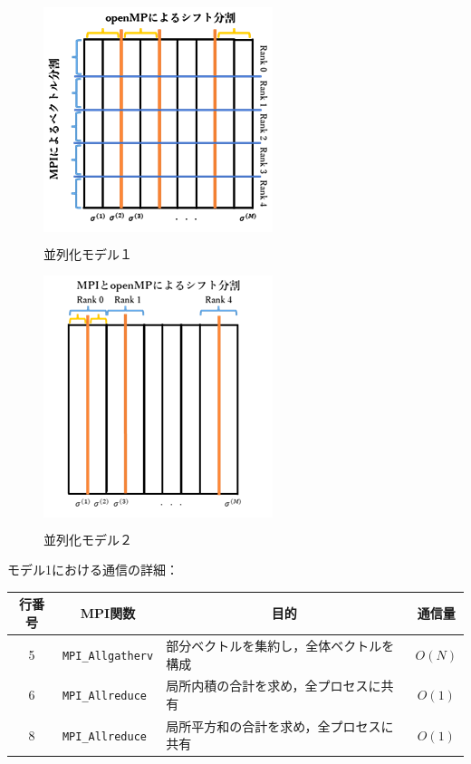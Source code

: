 \begin{figure}[H]
	\begin{center}
		\begin{minipage}[t]{0.49\columnwidth}
			\centering
			\colorbox{white}{ \includegraphics[scale=1.9]{./fig/parallel-model1.png} }
			\caption{並列化モデル１}
			\label{fig-parallel-model1}
		\end{minipage}
		\begin{minipage}[t]{0.49\columnwidth}
			\centering
			\colorbox{white}{ \includegraphics[scale=1.9]{./fig/parallel-model2.png} }
			\caption{並列化モデル２}
			\label{fig-parallel-model2}
		\end{minipage}
	\end{center}
\end{figure}

\vspace{5.1pt}
モデル1における通信の詳細：
\begin{table}[H]
	\centering
	\small
	\begin{tabular}{|c|l|l|c|}
	\hline
	行番号	& \multicolumn{1}{c|}{MPI関数}	& \multicolumn{1}{c|}{目的}				& 通信量	\\ \hline
	5		& \texttt{MPI\_Allgatherv}	& 部分ベクトルを集約し，全体ベクトルを構成		& $O(N)$	\\ \hline
	6		& \texttt{MPI\_Allreduce}	& 局所内積の合計を求め，全プロセスに共有		& $O(1)$	\\ \hline
	8		& \texttt{MPI\_Allreduce}	& 局所平方和の合計を求め，全プロセスに共有	& $O(1)$	\\ \hline
	\end{tabular}
\end{table}



